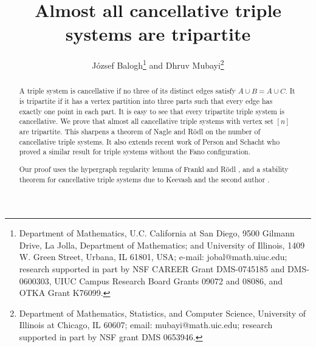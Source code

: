 \documentclass[11pt]{article}
\begin{document}
 \usepackage{./extract}
\newtheorem{theorem}{Theorem}
\newtheorem{corollary}{Corollary}
\newtheorem{lemma}{Lemma}
\newtheorem{proposition}{Proposition}
\newtheorem{conjecture}{Conjecture}
\newcommand\eps{\varepsilon}

\newcommand{\brac}[1]{\left(#1\right)}
\newcommand{\bfrac}[2]{\brac{\frac{#1}{#2}}}
\newcommand{\rdown}[1]{\left\lfloor#1\right\rfloor}
\newcommand{\rdup}[1]{\left\lceil#1\right\rfloor}
\newcommand{\me}{\mathrm{e}}
\newcommand{\ee}{\epsilon}
\newcommand{\ex}{\mathrm{ex}}
\newcommand{\Bin}{\mathrm{Bin}}
\newcommand{\cG}{{{\cal G}}}
\newcommand{\cK}{{\cal K}}
\newcommand{\cH}{{\cal H}}
\newcommand{\cP}{{\cal P}}
\newcommand{\cJ}{{\cal J}}
\newcommand{\cE}{{\cal E}}
\def\Q{\mathcal{Q}}
\newtheorem{definition}[theorem]{Definition}
\def\FF{\mathcal{F}}
\def\F{\mathcal{F}}
\def\eps{\varepsilon}
\newcommand{\eee}{{\mathbb E}}
\def\HH{\mathcal{H}}
\parindent=0pt

\title{Almost all cancellative triple systems are tripartite}


\author{J\'ozsef Balogh\thanks{{Department of
Mathematics, U.C. California at San Diego, 9500 Gilmann Drive, La
Jolla, Department of Mathematics; and  University of Illinois, 1409
W. Green Street, Urbana, IL 61801, USA}; e-mail:
{jobal@math.uiuc.edu;} research  supported in part   by NSF CAREER
Grant DMS-0745185 and DMS-0600303, UIUC Campus Research Board Grants
09072 and 08086, and OTKA Grant K76099.}  \quad  and \quad Dhruv
Mubayi\thanks{Department of Mathematics, Statistics, and Computer
Science, University of Illinois at Chicago, IL 60607;  email:
mubayi@math.uic.edu; research  supported in part by  NSF grant DMS
0653946.}}

\maketitle

\vspace{-0.4in}

\begin{abstract}
A triple system is cancellative if  no three of its distinct edges satisfy $A \cup B=A \cup C$.
 It is tripartite if it has a vertex partition into three parts such that every edge has exactly one point in each part.
   It is easy to see that every tripartite triple system is cancellative. We prove that almost all cancellative triple systems with
    vertex set $[n]$ are tripartite. This sharpens a  theorem of Nagle and R\"odl \cite{NR} on the number of cancellative triple
     systems.  It also extends recent work of Person and Schacht \cite{PSch} who proved a similar result
      for triple systems without the Fano configuration.

Our proof  uses the  hypergraph regularity lemma of Frankl and R\"odl \cite{FR}, and a stability
theorem for cancellative triple systems  due to Keevash and the second author \cite{KM}.
\end{abstract}
\end{document}
